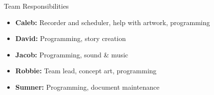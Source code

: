 \documentclass{teamepsilon}
\begin{document}
\begin{frame}{Team Responsibilities}
    \begin{itemize}
        \item \textbf{Caleb:} Recorder and scheduler, help with artwork,
            programming
        \item \textbf{David:} Programming, story creation
        \item \textbf{Jacob:} Programming, sound \& music
        \item \textbf{Robbie:} Team lead, concept art, programming
        \item \textbf{Sumner:} Programming, document maintenance
    \end{itemize}
\end{frame}
\end{document}
